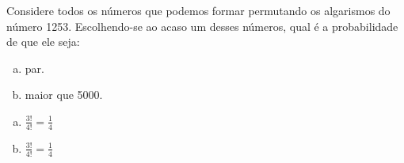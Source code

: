 \begin{ex}
Considere todos os números que podemos formar permutando os algarismos do número 1253. Escolhendo-se ao acaso um desses números, qual é a probabilidade de que ele seja:
   \begin{enumerate}[(a)]
   \item par.
   \item maior que 5000.
   \end{enumerate}
     \begin{sol}
       \phantom{A}
         \begin{enumerate} [(a)]
             \item $\frac{3!}{4!}=\frac{1}{4}$
             \item $\frac{3!}{4!}=\frac{1}{4}$
         \end{enumerate}
     \end{sol}
\end{ex}
